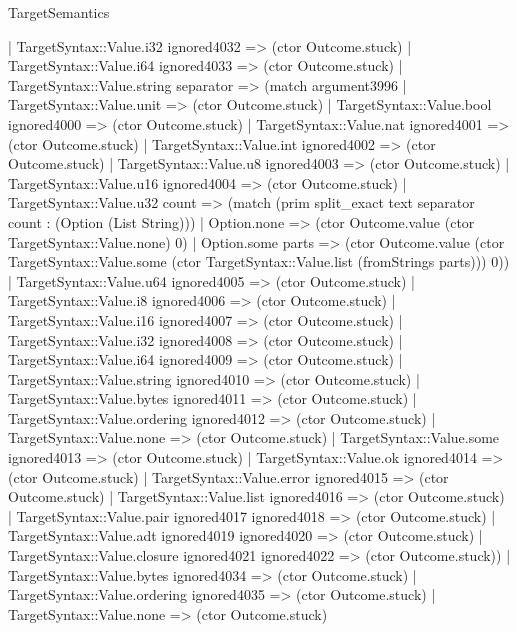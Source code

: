 \begin{lexlean}{TargetSemantics}
\begin{semanticmodule}
{                | TargetSyntax::Value.i32 ignored4032 => (ctor Outcome.stuck)
                | TargetSyntax::Value.i64 ignored4033 => (ctor Outcome.stuck)
                | TargetSyntax::Value.string separator => (match argument3996
                  | TargetSyntax::Value.unit => (ctor Outcome.stuck)
                  | TargetSyntax::Value.bool ignored4000 => (ctor Outcome.stuck)
                  | TargetSyntax::Value.nat ignored4001 => (ctor Outcome.stuck)
                  | TargetSyntax::Value.int ignored4002 => (ctor Outcome.stuck)
                  | TargetSyntax::Value.u8 ignored4003 => (ctor Outcome.stuck)
                  | TargetSyntax::Value.u16 ignored4004 => (ctor Outcome.stuck)
                  | TargetSyntax::Value.u32 count => (match (prim split_exact text separator count : (Option (List String)))
                    | Option.none => (ctor Outcome.value (ctor TargetSyntax::Value.none) 0)
                    | Option.some parts => (ctor Outcome.value (ctor TargetSyntax::Value.some (ctor TargetSyntax::Value.list (fromStrings parts))) 0))
                  | TargetSyntax::Value.u64 ignored4005 => (ctor Outcome.stuck)
                  | TargetSyntax::Value.i8 ignored4006 => (ctor Outcome.stuck)
                  | TargetSyntax::Value.i16 ignored4007 => (ctor Outcome.stuck)
                  | TargetSyntax::Value.i32 ignored4008 => (ctor Outcome.stuck)
                  | TargetSyntax::Value.i64 ignored4009 => (ctor Outcome.stuck)
                  | TargetSyntax::Value.string ignored4010 => (ctor Outcome.stuck)
                  | TargetSyntax::Value.bytes ignored4011 => (ctor Outcome.stuck)
                  | TargetSyntax::Value.ordering ignored4012 => (ctor Outcome.stuck)
                  | TargetSyntax::Value.none => (ctor Outcome.stuck)
                  | TargetSyntax::Value.some ignored4013 => (ctor Outcome.stuck)
                  | TargetSyntax::Value.ok ignored4014 => (ctor Outcome.stuck)
                  | TargetSyntax::Value.error ignored4015 => (ctor Outcome.stuck)
                  | TargetSyntax::Value.list ignored4016 => (ctor Outcome.stuck)
                  | TargetSyntax::Value.pair ignored4017 ignored4018 => (ctor Outcome.stuck)
                  | TargetSyntax::Value.adt ignored4019 ignored4020 => (ctor Outcome.stuck)
                  | TargetSyntax::Value.closure ignored4021 ignored4022 => (ctor Outcome.stuck))
                | TargetSyntax::Value.bytes ignored4034 => (ctor Outcome.stuck)
                | TargetSyntax::Value.ordering ignored4035 => (ctor Outcome.stuck)
                | TargetSyntax::Value.none => (ctor Outcome.stuck)
}
\end{semanticmodule}
\end{lexlean}
